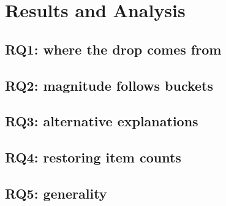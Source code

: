 \section{Results and Analysis}\label{sec:results}
\subsection{RQ1: where the drop comes from}\label{sec:rq1}
\subsection{RQ2: magnitude follows buckets}\label{sec:rq2}
\subsection{RQ3: alternative explanations}\label{sec:rq3}
\subsection{RQ4: restoring item counts}\label{sec:rq4}
\subsection{RQ5: generality}\label{sec:rq5}
